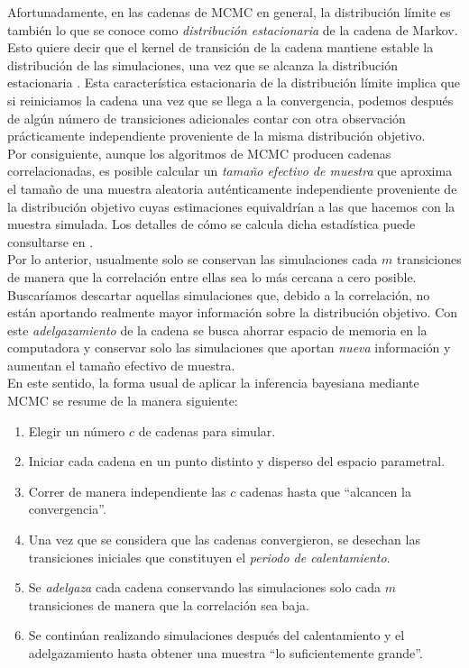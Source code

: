 Afortunadamente, en las cadenas de MCMC en general, la distribución límite es también lo que se conoce como \textit{distribución estacionaria} de la cadena de Markov. Esto quiere decir que el kernel de transición de la cadena mantiene estable la distribución de las simulaciones, una vez que se alcanza la distribución estacionaria \parencite{Neal93}. Esta característica estacionaria de la distribución límite implica que si reiniciamos la cadena una vez que se llega a la convergencia, podemos después de algún número de transiciones adicionales contar con otra observación prácticamente independiente proveniente de la misma distribución objetivo.\\ 

Por consiguiente, aunque los algoritmos de MCMC producen cadenas correlacionadas, es posible calcular un \textit{tamaño efectivo de muestra} que aproxima el tamaño de una muestra aleatoria auténticamente independiente proveniente de la distribución objetivo cuyas estimaciones equivaldrían a las que hacemos con la muestra simulada. Los detalles de cómo se calcula dicha estadística puede consultarse en \textcite{Gelman13}.\\ 

Por lo anterior, usualmente solo se conservan las simulaciones cada $m$ transiciones de manera que la correlación entre ellas sea lo más cercana a cero posible. Buscaríamos descartar aquellas simulaciones que, debido a la correlación, no están aportando realmente mayor información sobre la distribución objetivo. Con este \textit{adelgazamiento} de la cadena se busca ahorrar espacio de memoria en la computadora y conservar solo las simulaciones que aportan \textit{nueva} información y aumentan el tamaño efectivo de muestra.\\ 

En este sentido, la forma usual de aplicar la inferencia bayesiana mediante MCMC se resume de la manera siguiente: 

\begin{enumerate}
\item Elegir un número $c$ de cadenas para simular.
\item Iniciar cada cadena en un punto distinto y disperso del espacio parametral. 
\item Correr de manera independiente las $c$ cadenas hasta que ``alcancen la convergencia''. 
\item Una vez que se considera que las cadenas convergieron, se desechan las transiciones iniciales que constituyen el \textit{periodo de calentamiento}. 
\item Se \textit{adelgaza} cada cadena conservando las simulaciones solo cada $m$ transiciones de manera que la correlación sea baja. 
\item Se continúan realizando simulaciones después del calentamiento y el adelgazamiento hasta obtener una muestra ``lo suficientemente grande''.  
\end{enumerate}

